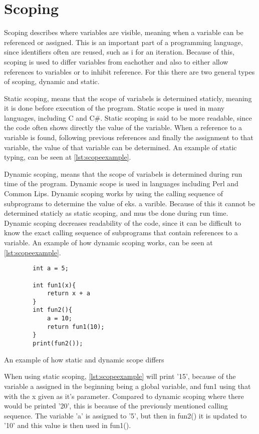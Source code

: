 \section{Scoping}
Scoping describes where variables are visible, meaning when a variable can be referenced or assigned. This is an important part of a programming language, since identifiers often are reused, such as i for an iteration. Because of this, scoping is used to differ variables from eachother and also to either allow references to variables or to inhibit reference. For this there are two general types of scoping, dynamic and static.

Static scoping, means that the scope of variabels is determined staticly, meaning it is done before execution of the program. Static scope is used in many languages, including C and C\#. Static scoping is said to be more readable, since the code often shows directly the value of the variable. When a reference to a variable is found, following previous references and finally the assignment to that variable, the value of that variable can be determined. An example of static typing, can be seen at \ref{lst:scopeexample}.

Dynamic scoping, means that the scope of variabels is determined during run time of the program. Dynamic scope is used in languages including Perl and Common Lips. Dynamic scoping works by using the calling sequence of subprograms to determine the value of eks. a varible. Because of this it cannot be determined staticly as static scoping, and mus tbe done during run time. Dynamic scoping decreases readability of the code, since it can be difficult to know the exact calling sequence of subprograms that contain references to a variable\cite{Sebesta2016}. An example of how dynamic scoping works, can be seen at \ref{lst:scopeexample}. 

\begin{listing}[htb!]
    \begin{verbatim}
        int a = 5;

        int fun1(x){
            return x + a
        }
        int fun2(){
            a = 10;
            return fun1(10);
        }
        print(fun2());
    \end{verbatim}
    \caption{An example of how static and dynamic scope differs}
    \label{lst:scopeexample}
\end{listing}

When using static scoping, \ref{lst:scopeexample} will print '15', because of the variable a assigned in the beginning being a global variable, and fun1 using that with the x given as it's parameter. Compared to dynamic scoping where there would be printed '20', this is because of the previously mentioned calling sequence. The variable 'a' is assigned to '5', but then in fun2() it is updated to '10' and this value is then used in fun1().

